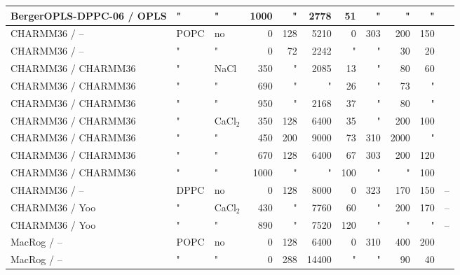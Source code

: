 \documentclass[twoside,twocolumn,9pt]{article}
\begin{document}
\begin{table}[!p]
\begin{minipage}[t]{\textwidth}
\begin{tabular}{l l l r r r r r r r c}
  BergerOPLS-DPPC-06\cite{tieleman06} / OPLS\cite{aqvist90} &   " & " & 1000 & " 		& 2778 & 51 & "  & " & " &\citenum{bergerOPLSDPPCfiles1000mMnacl} \\
  \hline
  CHARMM36\cite{klauda10} / -- & POPC & no & 0 & 128 							& 5210 & 0 & 303 & 200 & 150 & \citenum{charmm36files} \\ %
  CHARMM36\cite{klauda10} / --  & " & " & 0           & 72 							& 2242 & "  & "  & 30 & 20 & \citenum{charmm36filesSHORT} \\
  CHARMM36\cite{klauda10} / CHARMM36\cite{venable13} & " & NaCl & 350   & " 		& 2085 & 13  & "  & 80 & 60 & \citenum{charmmPOPC350mMNaClfiles} \\
  CHARMM36\cite{klauda10} / CHARMM36\cite{venable13} & " & " & 690 & " 			& " & 26 & "  & 73 & " & \citenum{charmmPOPC690mMNaClfiles}   \\
  CHARMM36\cite{klauda10} / CHARMM36\cite{venable13}  & " & " & 950 & " 			& 2168 & 37 & "  & 80 & " &\citenum{charmmPOPC950mMNaClfiles}  \\
  CHARMM36\cite{klauda10} / CHARMM36 & " & CaCl$_2$ & 350  & 128 				& 6400 & 35 & "  & 200  & 100 & \citenum{charmmPOPC350mMCaClfiles}  \\
  CHARMM36\cite{klauda10} / CHARMM36 & " & " & 450  & 200 					& 9000 & 73 & 310  & 2000  & " & \citenum{charmmPOPC450mMCaClfiles}  \\
  CHARMM36\cite{klauda10} / CHARMM36 & " & " & 670  & 128 					& 6400 & 67 & 303  & 200  & 120 & \citenum{charmmPOPC670mMCaClfiles}  \\  
  CHARMM36\cite{klauda10} / CHARMM36 & " & " & 1000 & " 						& " & 100 & " & "  & 100 & \citenum{charmmPOPC1000mMCaClfiles}  \\
  CHARMM36\cite{klauda10} / -- & DPPC & no & 0  & 128 							& 8000 & 0 & 323  & 170 & 150 & --  \\
  CHARMM36\cite{klauda10} / Yoo\cite{yoo16}  & " & CaCl$_2$ & 430   & " 			& 7760 & 60 & "  & 200 & 170 & --  \\
  CHARMM36\cite{klauda10} / Yoo\cite{yoo16}  & " & " & 890  & " 					& 7520 & 120 & "  & " & " & --  \\
  \hline
  MacRog\cite{maciejewski14} / -- & POPC & no & 0 & 128 							& 6400 & 0 & 310 & 400& 200 & \citenum{macrogCHOLfiles}  \\ %
  MacRog\cite{maciejewski14} / -- & " & " & 0 & 288 								& 14400 & " & " & 90 & 40  & \citenum{macrogdehydFILES}  \\  

\end{tabular}
\end{minipage}
\end{table}
\end{document}

